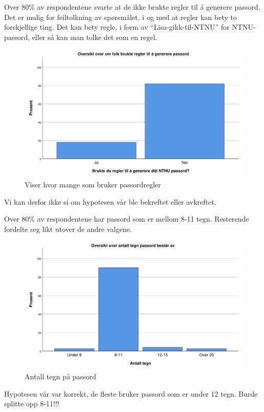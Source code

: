 Over 80\% av respondentene svarte at de ikke brukte regler til å generere passord. Det er mulig for feiltolkning av spørsmålet, i og med at regler kan bety to forskjellige ting. Det kan bety regle, i form av ``Lisa-gikk-til-NTNU'' for NTNU-passord, eller så kan man tolke det som en regel. 
\begin{figure}[H]
    \centering
    \includegraphics[scale=0.5]{case_2/bilder/spss/regler_passord.pdf}
    \caption[passordregler]{Viser hvor mange som bruker passordregler}
    \label{fig:passordregler}
\end{figure}
Vi kan derfor ikke si om hypotesen vår ble bekreftet eller avkreftet.

Over 80\% av respondentene har passord som er mellom 8-11 tegn. Resterende fordelte seg likt utover de andre valgene. 
\begin{figure}[H]
    \centering
    \includegraphics[scale=0.5]{case_2/bilder/spss/antall_tegn.pdf}
    \caption[antalltegn]{Antall tegn på passord}
    \label{fig:antalltegn}
\end{figure}
Hypotesen vår var korrekt, de fleste bruker passord som er under 12 tegn. Burde splitte opp 8-11!!!


